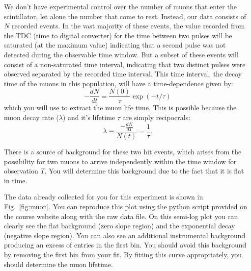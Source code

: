 We don't have experimental control over the number of muons that enter the scintillator, let alone the number that come to rest.   Instead, our data consists of $N$ recorded events.  In the vast majority of these events, the value recorded from the TDC (time to digital converter) for the time between two pulses will be saturated (at the maximum value) indicating that a second pulse was not detected during the observable time window.  But a subset of these events will consist of a non-saturated time interval, indicating that two distinct pulses were observed separated by the recorded time interval.  This time interval, the decay time of the muons in this population, will have a time-dependence given by:
\begin{displaymath}
-\frac{dN}{dt} = \frac{N(0)}{\tau} \exp(-t/\tau)
\end{displaymath}
which you will use to extract the muon life time.  This is possible because the muon decay rate ($\lambda$)
and it's lifetime $\tau$ are simply recipocrals:
\begin{displaymath}
\lambda \equiv \frac{-\frac{dN}{dT}}{N(t)} = \frac{1}{\tau}.
\end{displaymath}

There is a source of background for these two hit events, which arises from the possibility for two muons to arrive independently within the time window for observation $T$.  You will determine this background due to the fact that it is flat in time.


The data already collected for you for this experiment is shown in Fig.~\ref{fig:muon}.  You can reproduce this plot using the python script provided on the course website along with the raw data file.  On this semi-log plot you can clearly see the flat background (zero slope region) and the exponential decay (negative slope region).  You can also see an additional instrumental background producing an excess of entries in the first bin.  You should avoid this background by removing the first bin from your fit.  By fitting this curve appropriately, you should determine the muon lifetime.

